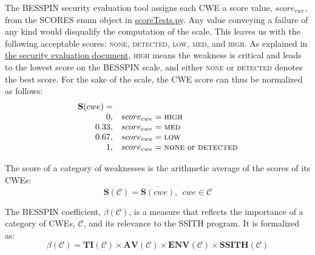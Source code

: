 \documentclass{article}
\begin{document}
The BESSPIN security evaluation tool assigns each CWE a score value, $score_{cwe}$, from the {\scshape SCORES} enum object in \href{https://github.com/DARPA-SSITH-Demonstrators/SSITH-FETT-Target/blob/develop/fett/cwesEvaluation/scoreTests.py}{scoreTests.py}. Any value conveying a failure of any kind would disqualify the computation of the scale. This leaves us with the following acceptable scores: {\scshape none}, {\scshape detected}, {\scshape low}, {\scshape med}, and {\scshape high}. As explained in \href{https://github.com/DARPA-SSITH-Demonstrators/SSITH-FETT-Target/blob/develop/docs/evaluateSecurityTestsMode.md}{the security evaluation document}, {\scshape high} means the weakness is critical and leads to the lowest score on the BESSPIN scale, and either {\scshape none} or {\scshape detected} denotes the best score. For the sake of the scale, the CWE score can thus be normalized as follows:
\begin{equation}
\begin{array}{rl}
\mathbf{S}(cwe) = \\ 
      0, &   score_{cwe} = \text{{\scshape high}} \\
      0.33, & score_{cwe} = \text{{\scshape med}} \\
      0.67, & score_{cwe} = \text{{\scshape low}} \\
      1, &    score_{cwe} = \text{{\scshape none} or {\scshape detected}}
\end{array}
\end{equation}

The score of a category of weaknesses is the arithmetic average of the scores of its CWEs:
\begin{equation}
    \mathbf{S}(\mathcal{C}) = \overline{\mathbf{S}(cwe)}, \ \ cwe \in \mathcal{C}
\end{equation}

The BESSPIN coefficient, $\beta(\mathcal{C})$, is a measure that reflects the importance of a category of CWEs, $\mathcal{C}$, and its relevance to the SSITH program. It is formalized as: 
\begin{equation}
    \beta(\mathcal{C}) = \mathbf{TI}(\mathcal{C}) 
    \times \mathbf{AV}(\mathcal{C}) 
    \times \mathbf{ENV}(\mathcal{C}) 
    \times \mathbf{SSITH}(\mathcal{C})
\end{equation}
\end{document}
